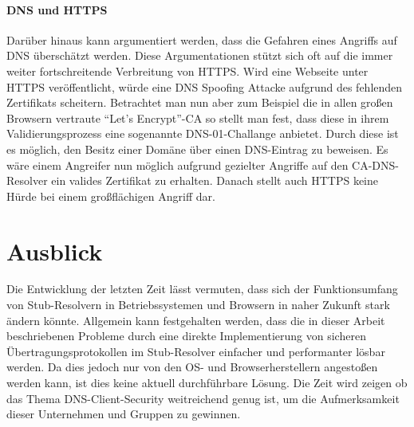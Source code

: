 \paragraph{DNS und HTTPS}
Darüber hinaus kann argumentiert werden, dass die Gefahren eines Angriffs auf DNS überschätzt werden. Diese Argumentationen stützt sich oft auf die immer weiter fortschreitende Verbreitung von HTTPS. Wird eine Webseite unter HTTPS veröffentlicht, würde eine DNS Spoofing Attacke aufgrund des fehlenden Zertifikats scheitern. Betrachtet man nun aber zum Beispiel die in allen großen Browsern vertraute ``Let's Encrypt''-CA so stellt man fest, dass diese in ihrem Validierungsprozess eine sogenannte DNS-01-Challange anbietet. Durch diese ist es möglich, den Besitz einer Domäne über einen DNS-Eintrag zu beweisen. Es wäre einem Angreifer nun möglich aufgrund gezielter Angriffe auf den CA-DNS-Resolver ein valides Zertifikat zu erhalten. Danach stellt auch HTTPS keine Hürde bei einem großflächigen Angriff dar.

\section{Ausblick}
Die Entwicklung der letzten Zeit lässt vermuten, dass sich der Funktionsumfang von Stub-Resolvern in Betriebssystemen\cite{Wallen2018} und Browsern\cite{McManus2018a} in naher Zukunft stark ändern könnte. Allgemein kann festgehalten werden, dass die in dieser Arbeit beschriebenen Probleme durch eine direkte Implementierung von sicheren Übertragungsprotokollen im Stub-Resolver einfacher und performanter lösbar werden. Da dies jedoch nur von den \ac{OS}- und Browserherstellern angestoßen werden kann, ist dies keine aktuell durchführbare Lösung. Die Zeit wird zeigen ob das Thema DNS-Client-Security weitreichend genug ist, um die Aufmerksamkeit dieser Unternehmen und Gruppen zu gewinnen.  

